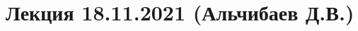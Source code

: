 \documentclass[main.tex]{subfiles}
\begin{document}
\section{Лекция 18.11.2021 (Альчибаев Д.В.)}
\end{document}
